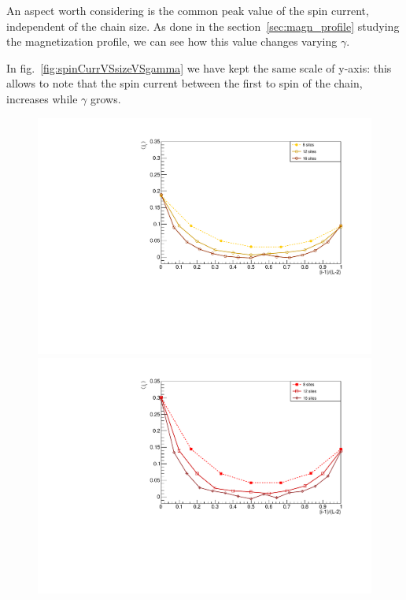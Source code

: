 An aspect worth considering is the common peak value of the spin current, independent of the chain size. As done in the section~\ref{sec:magn_profile} studying the magnetization profile, we can see how this value changes varying $\gamma$. 

In fig.~\ref{fig:spinCurrVSsizeVSgamma} we have kept the same scale of y-axis: this allows to note that the spin current between the first to spin of the chain, increases while $\gamma$ grows. 

\begin{figure}[H]
\centering
    \includegraphics[scale=0.55]{Figures/spinCurrVSsize_Gamma05.pdf}
    \label{fig:8sites_LMvsGamma}
    \includegraphics[scale=0.55]{Figures/spinCurrVSsize_Gamma1.pdf}
    \label{fig:12sites_LMvsGamma}

\end{figure}
